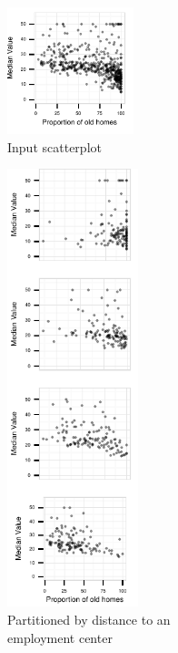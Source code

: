 
\begin{figure}
 \centering 
    \begin{subfigure}[t]{1.45in}
        \includegraphics[width=1.45in]{images/AGE-MEDV.pdf}
        \caption{Input scatterplot}
        \label{fig:method_original}
    \end{subfigure}
    \begin{subfigure}[t]{1.5in}
  	\includegraphics[width=1.5in]{images/DIS.pdf}
	\caption{Partitioned by distance to an\\ employment center}
	 \label{fig:method_actual}
    \end{subfigure}
    \begin{subfigure}[t]{1.5in}

\end{subfigure}
\end{figure}
